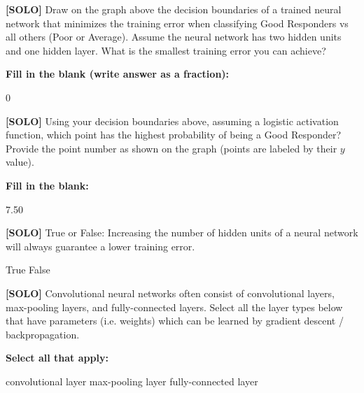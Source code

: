\documentclass[11pt,addpoints,answers]{exam}
\newcommand{\solo}{\textbf{[SOLO]} }
\begin{document}
\begin{questions}
    \question[3] \solo Draw on the graph above the decision boundaries of a trained neural network that minimizes the training error when classifying Good Responders vs all others (Poor or Average). Assume the neural network has two hidden units and one hidden layer. What is the smallest training error you can achieve?
    
        \textbf{Fill in the blank (write answer as a fraction):}
    
    \begin{tcolorbox}[fit,height=1cm, width=4cm, blank, borderline={1pt}{-2pt},nobeforeafter]
    \vspace{5pt}
    \hspace{5pt}
    0
    \end{tcolorbox}
    
    
    \question[2] \solo Using your decision boundaries above, assuming a logistic activation function, which point has the highest probability of being a Good Responder? Provide the point number as shown on the graph (points are labeled by their $y$ value).
    
            \textbf{Fill in the blank:}
    
    \begin{tcolorbox}[fit,height=1cm, width=4cm, blank, borderline={1pt}{-2pt},nobeforeafter]
    \vspace{5pt}
    \hspace{5pt}
    7.50
    \end{tcolorbox}
    
    
    \question[2] \solo True or False: Increasing the number of hidden units of a neural network will always guarantee a lower training error. 
    
    \begin{checkboxes}
        \choice True
        \CorrectChoice False
    \end{checkboxes}
    


    \question[2] \solo Convolutional neural networks often consist of convolutional layers, max-pooling layers, and fully-connected layers. Select all the layer types below that have parameters (i.e. weights) which can be learned by gradient descent / backpropagation.
    
    \textbf{Select all that apply:}
    {
    \checkboxchar{$\Box$} \checkedchar{$\blacksquare$}
        \begin{checkboxes}
            \CorrectChoice convolutional layer
            \choice max-pooling layer
            \CorrectChoice fully-connected layer
        \end{checkboxes}
    }
    

\end{questions}
\end{document}
